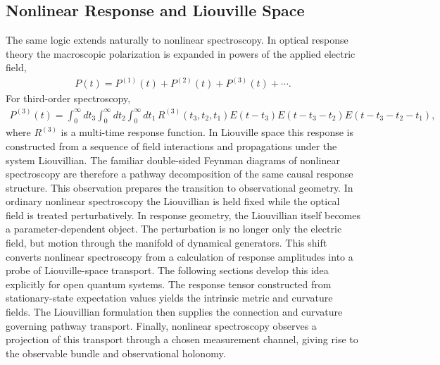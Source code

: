 \subsection{Nonlinear Response and Liouville Space}
The same logic extends naturally to nonlinear spectroscopy. In
optical response theory the macroscopic polarization is expanded
in powers of the applied electric field,
\begin{align}
P(t)
=
P^{(1)}(t)
+
P^{(2)}(t)
+
P^{(3)}(t)
+\cdots .
\end{align}
For third-order spectroscopy,
\begin{align}
P^{(3)}(t)
=
\int_0^\infty dt_3
\int_0^\infty dt_2
\int_0^\infty dt_1\,
R^{(3)}(t_3,t_2,t_1)
E(t-t_3)
E(t-t_3-t_2)
E(t-t_3-t_2-t_1),
\end{align}
where \(R^{(3)}\) is a multi-time response function. In
Liouville space this response is constructed from a sequence of
field interactions and propagations under the system
Liouvillian. The familiar double-sided Feynman diagrams of
nonlinear spectroscopy are therefore a pathway decomposition of
the same causal response structure.
This observation prepares the transition to observational
geometry. In ordinary nonlinear spectroscopy the Liouvillian is
held fixed while the optical field is treated perturbatively. In
response geometry, the Liouvillian itself becomes a
parameter-dependent object. The perturbation is no longer only
the electric field, but motion through the manifold of dynamical
generators. This shift converts nonlinear spectroscopy from a
calculation of response amplitudes into a probe of Liouville-space
transport.
The following sections develop this idea explicitly for open
quantum systems. The response tensor constructed from
stationary-state expectation values yields the intrinsic metric and
curvature fields. The Liouvillian formulation then supplies the
connection and curvature governing pathway transport. Finally,
nonlinear spectroscopy observes a projection of this transport
through a chosen measurement channel, giving rise to the
observable bundle and observational holonomy.


